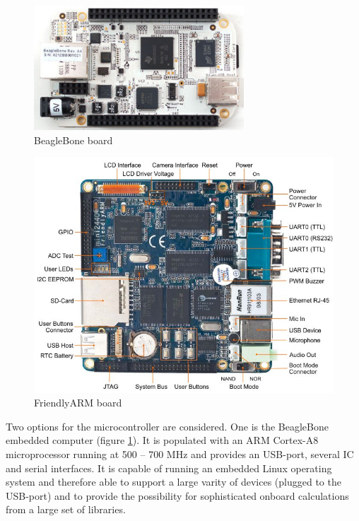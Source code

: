 \documentclass[fontsize=11pt,paper=a4,]{scrartcl}
\begin{document}
\begin{figure}
\centering
\includegraphics[width=0.7\textwidth]{figures/beagle_bone.jpg}
\caption{BeagleBone board}
\label{fig:beaglebone_picture}
\end{figure}
\begin{figure}
\centering
\includegraphics[width=1\textwidth]{figures/mini2440_3.jpg}
\caption{FriendlyARM board}
\label{fig:friendlyarm_picture}
\end{figure}

Two options for the microcontroller are considered.
One is the BeagleBone embedded computer \cite{BeagleBone:SRM} (figure \ref{fig:beaglebone_picture}). It is populated with an ARM Cortex-A8 microprocessor running at 500 -- 700 MHz and provides an USB-port, several I{\texttwosuperior}C and serial interfaces. It is capable of running an embedded Linux operating system and therefore able to support a large varity of devices (plugged to the USB-port) and to provide the possibility for sophisticated onboard calculations from a large set of libraries.
\end{document}
